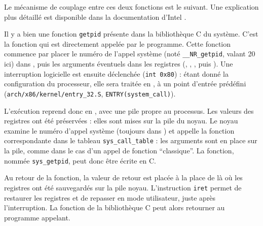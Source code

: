 Le mécanisme de couplage entre ces deux fonctions est le suivant. Une
explication plus détaillé est disponible dans la documentation d'Intel
\cite{intelsys}.

Il y a bien une fonction \texttt{getpid} présente dans la bibliothèque C du
système. C'est la fonction qui est directement appelée par le programme. Cette
fonction commence par placer le numéro de l'appel système (noté
\texttt{\_\_NR\_getpid}, valant 20 ici) dans \eax, puis les arguments éventuels
dans les registres (\ebx, \ecx, \edx, \esi puis \edi). Une interruption
logicielle est ensuite déclenchée (\texttt{int 0x80}) : étant donné la
configuration du processeur, elle sera traitée en , à un point
d'entrée prédéfini (\texttt{arch/x86/kernel/entry\_32.S},
\texttt{ENTRY(system\_call)}).

L'exécution reprend donc en , avec une pile propre au processus.
Les valeurs des registres ont été préservées : elles sont mises sur la pile du
noyau. Le noyau examine le numéro d'appel système (toujours dans \eax) et
appelle la fonction correspondante dans le tableau \texttt{sys\_call\_table} :
les arguments sont en place sur la pile, comme dans le cas d'un appel de
fonction ``classique''. La fonction, nommée \texttt{sys\_getpid}, peut donc être
écrite en C.

Au retour de la fonction, la valeur de retour est placée à la place de \eax là
où les registres ont été sauvegardés sur la pile noyau. L'instruction
\texttt{iret} permet de restaurer les registres et de repasser en mode
utilisateur, juste après l'interruption. La fonction de la bibliothèque C peut
alors retourner au programme appelant.

